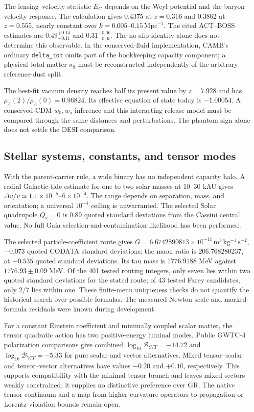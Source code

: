 The lensing--velocity statistic $E_G$ depends on the Weyl potential and
the baryon velocity response. The calculation gives 0.4375 at
$z=0.316$ and 0.3862 at $z=0.555$, nearly constant over
$k=0.005$--$0.15\,\mathrm{Mpc}^{-1}$. The cited ACT--BOSS estimates
are $0.49^{+0.14}_{-0.11}$ and $0.31^{+0.06}_{-0.05}$.
The no-slip identity alone does not determine this observable.
In the conserved-fluid implementation, CAMB's ordinary
\texttt{delta\_tot} omits part of the bookkeeping capacity component;
a physical total-matter $\sigma_8$ must be reconstructed independently
of the arbitrary reference-dust split. 

The best-fit vacuum density reaches half its present value by
$z=7.928$ and has $\rho_\Lambda(2)/\rho_\Lambda(0)=0.96824$.
Its effective equation of state today is $-1.00054$. A conserved-CDM
$w_0,w_a$ inference and this interacting release model must be compared
through the same distances and perturbations. The phantom sign alone
does not settle the DESI comparison. 

\subsection{Stellar systems, constants, and tensor modes}
With the parent-carrier rule, a wide binary has no independent capacity
halo. A radial Galactic-tide estimate for one to two solar masses at
10--30 kAU gives $\Delta v/v\simeq1.1\times10^{-5}$--$6\times10^{-4}$.
The range depends on separation, mass, and orientation; a universal
$10^{-4}$ ceiling is unwarranted. The selected Solar quadrupole
$Q_2=0$ is 0.89 quoted standard deviations from the Cassini central
value. No full Gaia selection-and-contamination likelihood has been
performed. 

The selected particle-coefficient route gives
$G=6.6742890813\times10^{-11}\,\mathrm{m^3\,kg^{-1}\,s^{-2}}$,
$-0.073$ quoted CODATA standard deviations; the muon ratio is
$206.768280237$, at $-0.535$ quoted standard deviations. Its tau mass
is 1776.9188 MeV against $1776.93\pm0.09$ MeV. Of the 401 tested
routing integers, only seven lies within two quoted standard deviations
for the stated route; of 43 tested Farey candidates, only $2/7$ lies
within one. These finite-menu uniqueness checks do not quantify the
historical search over possible formulas. The measured Newton scale
and marked-formula residuals were known during development.

For a constant Einstein coefficient and minimally coupled scalar matter,
the tensor quadratic action has two positive-energy luminal modes.
Public GWTC-4 polarization comparisons give combined
$\log_{10}\mathcal B_{S/T}=-14.72$ and
$\log_{10}\mathcal B_{V/T}=-5.33$ for pure scalar and vector
alternatives. Mixed tensor--scalar and tensor--vector alternatives
have values $-0.20$ and $+0.10$, respectively. This supports
compatibility with the minimal tensor branch and leaves mixed sectors
weakly constrained; it supplies no distinctive preference over GR.
The native tensor continuum and a map from higher-curvature operators
to propagation or Lorentz-violation bounds remain open.

